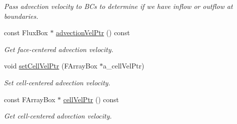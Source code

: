 \begin{DoxyCompactItemize}
\begin{DoxyCompactList}\small\item\em Pass advection velocity to B\-Cs to determine if we have inflow or outflow at boundaries. \end{DoxyCompactList}\item 
\hypertarget{class_advection_physics_a8ea518201cb8ced7ec0f9e154d2ad3a7}{const Flux\-Box $\ast$ \hyperlink{class_advection_physics_a8ea518201cb8ced7ec0f9e154d2ad3a7}{advection\-Vel\-Ptr} () const }\label{class_advection_physics_a8ea518201cb8ced7ec0f9e154d2ad3a7}

\begin{DoxyCompactList}\small\item\em Get face-\/centered advection velocity. \end{DoxyCompactList}\item 
\hypertarget{class_advection_physics_af2735891315496f683f06d508c30f80c}{void \hyperlink{class_advection_physics_af2735891315496f683f06d508c30f80c}{set\-Cell\-Vel\-Ptr} (F\-Array\-Box $\ast$a\-\_\-cell\-Vel\-Ptr)}\label{class_advection_physics_af2735891315496f683f06d508c30f80c}

\begin{DoxyCompactList}\small\item\em Set cell-\/centered advection velocity. \end{DoxyCompactList}\item 
\hypertarget{class_advection_physics_a6ffc44bd3b25fb08de34413317c647d5}{const F\-Array\-Box $\ast$ \hyperlink{class_advection_physics_a6ffc44bd3b25fb08de34413317c647d5}{cell\-Vel\-Ptr} () const }\label{class_advection_physics_a6ffc44bd3b25fb08de34413317c647d5}

\begin{DoxyCompactList}\small\item\em Get cell-\/centered advection velocity. \end{DoxyCompactList}\end{DoxyCompactItemize}
